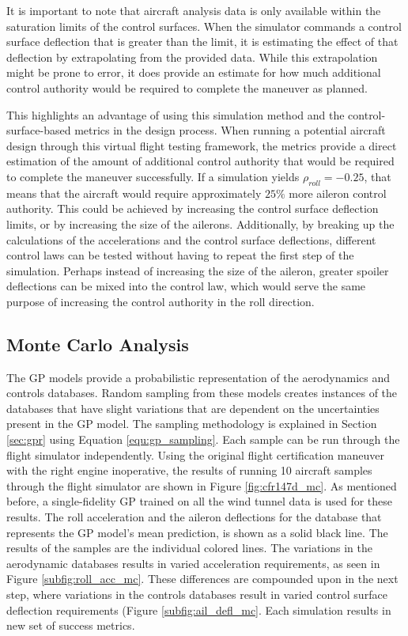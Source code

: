 It is important to note that aircraft analysis data is only available within the saturation limits of the control surfaces. 
When the simulator commands a control surface deflection that is greater than the limit, it is estimating the effect of that deflection by extrapolating from the provided data. 
While this extrapolation might be prone to error, it does provide an estimate for how much additional control authority would be required to complete the maneuver as planned. 

This highlights an advantage of using this simulation method and the control-surface-based metrics in the design process. 
When running a potential aircraft design through this virtual flight testing framework, the metrics provide a direct estimation of the amount of additional control authority that would be required to complete the maneuver successfully. 
If a simulation yields $\rho_{roll} = -0.25$, that means that the aircraft would require approximately $25\%$ more aileron control authority. 
This could be achieved by increasing the control surface deflection limits, or by increasing the size of the ailerons. 
Additionally, by breaking up the calculations of the accelerations and the control surface deflections, different control laws can be tested without having to repeat the first step of the simulation. 
Perhaps instead of increasing the size of the aileron, greater spoiler deflections can be mixed into the control law, which would serve the same purpose of increasing the control authority in the roll direction. 

\subsection{Monte Carlo Analysis} \label{subsec:mc_analysis}

The GP models provide a probabilistic representation of the aerodynamics and controls databases. 
Random sampling from these models creates instances of the databases that have slight variations that are dependent on the uncertainties present in the GP model.
The sampling methodology is explained in Section \ref{sec:gpr} using Equation \ref{equ:gp_sampling}.
Each sample can be run through the flight simulator independently.
Using the original flight certification maneuver with the right engine inoperative, the results of running 10 aircraft samples through the flight simulator are shown in Figure \ref{fig:cfr147d_mc}.
As mentioned before, a single-fidelity GP trained on all the wind tunnel data is used for these results. 
The roll acceleration and the aileron deflections for the database that represents the GP model's mean prediction, is shown as a solid black line. 
The results of the samples are the individual colored lines. 
The variations in the aerodynamic databases results in varied acceleration requirements, as seen in Figure \ref{subfig:roll_acc_mc}.
These differences are compounded upon in the next step, where variations in the controls databases result in varied control surface deflection requirements (Figure \ref{subfig:ail_defl_mc}.
Each simulation results in new set of success metrics. 

